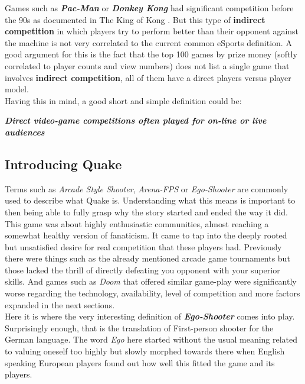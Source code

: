 Games such as \textbf{\textit{Pac-Man}} \citep{game:pacman} or \textbf{\textit{Donkey Kong}} \citep{game:donkeykong} had significant competition before the 90s as documented in The King of Kong \citep{kingKong}. But this type of \textbf{indirect competition} in which players try to perform better than their opponent against the machine is not very correlated to the current common eSports definition. A good argument for this is the fact that the top 100 games by prize money (softly correlated to player counts and view numbers) does not list a single game that involves \textbf{indirect competition}, all of them have a direct players versus player model.\\

Having this in mind, a good short and simple definition could be:\\

\begin{center}
\textbf{\textit{Direct video-game competitions often played for on-line or live audiences}}
\end{center}

\subsection{Introducing Quake}

Terms such as \textit{Arcade Style Shooter}, \textit{Arena-FPS} or \textit{Ego-Shooter} are commonly used to describe what Quake is. Understanding what this means is important to then being able to fully grasp why the story started and ended the way it did.\\

This game was about highly enthusiastic communities, almost reaching a somewhat healthy version of fanaticism. It came to tap into the deeply rooted but unsatisfied desire for real competition that these players had. Previously there were things such as the already mentioned arcade game tournaments but those lacked the thrill of directly defeating you opponent with your superior skills. And games such as \textit{Doom} \citep{game:doom} that offered similar game-play were significantly worse regarding the technology, availability, level of competition and more factors expanded in the next sections.\\

Here it is where the very interesting definition of \textbf{\textit{Ego-Shooter}} comes into play. Surprisingly enough, that is the translation of First-person shooter for the German language. The word \textit{Ego} here started without the usual meaning related to valuing oneself too highly but slowly morphed towards there when English speaking European players found out how well this fitted the game and its players.\\

